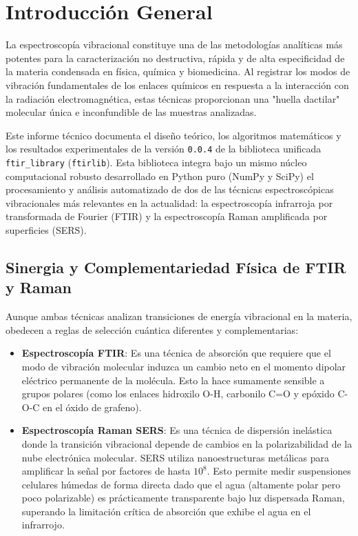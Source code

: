 \section{Introducción General}
La espectroscopía vibracional constituye una de las metodologías analíticas más potentes para la caracterización no destructiva, rápida y de alta especificidad de la materia condensada en física, química y biomedicina. Al registrar los modos de vibración fundamentales de los enlaces químicos en respuesta a la interacción con la radiación electromagnética, estas técnicas proporcionan una "huella dactilar" molecular única e inconfundible de las muestras analizadas.

Este informe técnico documenta el diseño teórico, los algoritmos matemáticos y los resultados experimentales de la versión \texttt{0.0.4} de la biblioteca unificada \texttt{ftir\_library} (\texttt{ftirlib}). Esta biblioteca integra bajo un mismo núcleo computacional robusto desarrollado en Python puro (NumPy y SciPy) el procesamiento y análisis automatizado de dos de las técnicas espectroscópicas vibracionales más relevantes en la actualidad: la espectroscopía infrarroja por transformada de Fourier (FTIR) y la espectroscopía Raman amplificada por superficies (SERS).

\subsection{Sinergia y Complementariedad Física de FTIR y Raman}
Aunque ambas técnicas analizan transiciones de energía vibracional en la materia, obedecen a reglas de selección cuántica diferentes y complementarias:
\begin{itemize}
    \item \textbf{Espectroscopía FTIR}: Es una técnica de absorción que requiere que el modo de vibración molecular induzca un cambio neto en el momento dipolar eléctrico permanente de la molécula. Esto la hace sumamente sensible a grupos polares (como los enlaces hidroxilo O-H, carbonilo C=O y epóxido C-O-C en el óxido de grafeno).
    \item \textbf{Espectroscopía Raman SERS}: Es una técnica de dispersión inelástica donde la transición vibracional depende de cambios en la polarizabilidad de la nube electrónica molecular. SERS utiliza nanoestructuras metálicas para amplificar la señal por factores de hasta $10^8$. Esto permite medir suspensiones celulares húmedas de forma directa dado que el agua (altamente polar pero poco polarizable) es prácticamente transparente bajo luz dispersada Raman, superando la limitación crítica de absorción que exhibe el agua en el infrarrojo.
\end{itemize}

